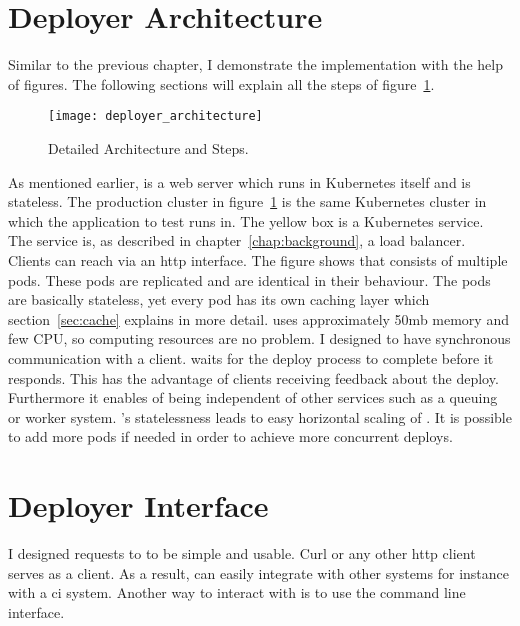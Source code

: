 \section{Deployer Architecture}

Similar to the previous chapter, I demonstrate the implementation with the help of
figures. The following sections will explain all the steps of
figure~\ref{fig:deployer_architecture}.

\begin{figure}[htbp]
  \centering
  \texttt{[image: deployer\_architecture]}
  \caption[nprtflow]{Detailed \deployer Architecture and Steps.}
  \label{fig:deployer_architecture}
\end{figure}

As mentioned earlier, \deployer is a web server which runs in Kubernetes itself and is
stateless. The production cluster in figure~\ref{fig:deployer_architecture} is the same
Kubernetes cluster in which the application to test runs in. The yellow box is a
Kubernetes service. The service is, as described in chapter~\ref{chap:background}, a
load balancer. Clients can reach \deployer via an http interface. The figure shows that
\deployer consists of multiple pods. These pods are replicated and are identical in their
behaviour. The pods are basically stateless, yet every pod has its own caching layer which
section~\ref{sec:cache} explains in more detail. \deployer uses approximately 50mb memory
and few CPU, so computing resources are no problem. I designed \deployer to have
synchronous communication with a client. \deployer waits for the deploy process to complete
before it responds. This has the advantage of clients receiving feedback about the
deploy. Furthermore it enables \deployer of being independent of other services such as a
queuing or worker system. \deployer's statelessness leads to easy horizontal scaling of
\deployer. It is possible to add more pods if needed in order to achieve more concurrent
deploys.

\section{Deployer Interface}
\label{sec:interface}

I designed requests to \deployer to be simple and usable. Curl or any other http client
serves as a client. As a result, \deployer can easily integrate with other systems for
instance with a \gls{ci} system. Another way to interact with \deployer is to use the
\depctl command line interface.

